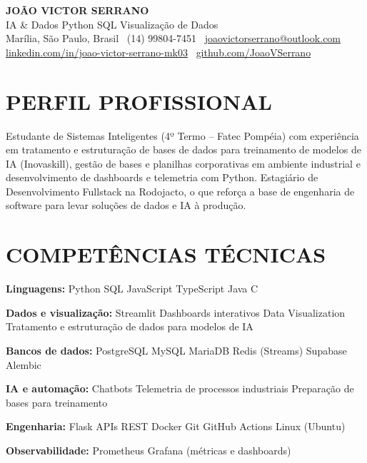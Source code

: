 \documentclass[9pt,a4paper]{extarticle}
\newcommand{\skill}[2]{\noindent\textbf{#1} #2\par}
\begin{document}
\begin{center}
  {\bfseries\color{navy}\fontsize{19}{22}\selectfont JOÃO VICTOR SERRANO}\\[2pt]
  {\color{gray}\fontsize{10}{12}\selectfont IA \& Dados \textperiodcentered{} Python \textperiodcentered{} SQL \textperiodcentered{} Visualização de Dados}\\[3pt]
  {\color{gray}\fontsize{8.6}{10.5}\selectfont Marília, São Paulo, Brasil \textbar\ (14) 99804-7451 \textbar\ \href{mailto:joaovictorserrano@outlook.com}{joaovictorserrano@outlook.com}\\
  \href{https://www.linkedin.com/in/joao-victor-serrano-mk03}{linkedin.com/in/joao-victor-serrano-mk03} \textbar\ \href{https://github.com/JoaoVSerrano}{github.com/JoaoVSerrano}}
\end{center}
\section*{PERFIL PROFISSIONAL}
Estudante de Sistemas Inteligentes (4º Termo – Fatec Pompéia) com experiência em tratamento e estruturação de bases de dados para treinamento de modelos de IA (Inovaskill), gestão de bases e planilhas corporativas em ambiente industrial e desenvolvimento de dashboards e telemetria com Python. Estagiário de Desenvolvimento Fullstack na Rodojacto, o que reforça a base de engenharia de software para levar soluções de dados e IA à produção.

\section*{COMPETÊNCIAS TÉCNICAS}
\skill{Linguagens:}{Python \textperiodcentered{} SQL \textperiodcentered{} JavaScript \textperiodcentered{} TypeScript \textperiodcentered{} Java \textperiodcentered{} C}
\skill{Dados e visualização:}{Streamlit \textperiodcentered{} Dashboards interativos \textperiodcentered{} Data Visualization \textperiodcentered{} Tratamento e estruturação de dados para modelos de IA}
\skill{Bancos de dados:}{PostgreSQL \textperiodcentered{} MySQL \textperiodcentered{} MariaDB \textperiodcentered{} Redis (Streams) \textperiodcentered{} Supabase \textperiodcentered{} Alembic}
\skill{IA e automação:}{Chatbots \textperiodcentered{} Telemetria de processos industriais \textperiodcentered{} Preparação de bases para treinamento}
\skill{Engenharia:}{Flask \textperiodcentered{} APIs REST \textperiodcentered{} Docker \textperiodcentered{} Git \textperiodcentered{} GitHub Actions \textperiodcentered{} Linux (Ubuntu)}
\skill{Observabilidade:}{Prometheus \textperiodcentered{} Grafana (métricas e dashboards)}
\end{document}
